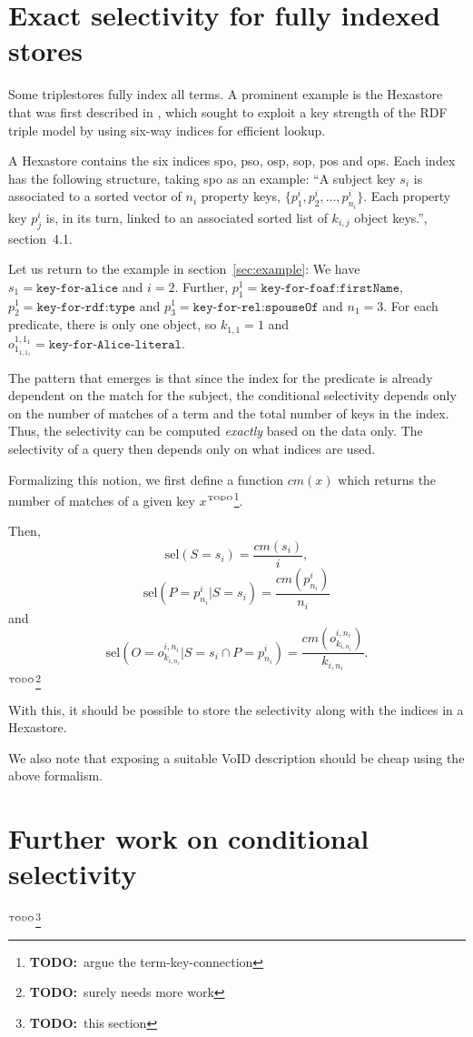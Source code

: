 \documentclass[12pt, draft]{article}
\newcommand{\todo}[1]{\ensuremath{^{\textrm{\tiny{TODO}\normalsize}}}\footnote{\textbf{TODO:}~#1}}
\newcommand{\sel}[1]{\ensuremath{\mathrm{sel}\left(#1\right)}}
\begin{document}
\section{Exact selectivity for fully indexed stores}

Some triplestores fully index all terms. A prominent example is the
Hexastore that was first described in
\cite{Weiss:2008:HSI:1453856.1453965}, which sought to exploit a key
strength of the RDF triple model by using six-way indices for
efficient lookup.

A Hexastore contains the six indices \textsf{spo}, \textsf{pso},
\textsf{osp}, \textsf{sop}, \textsf{pos} and \textsf{ops}. Each index
has the following structure, taking \textsf{spo} as an example: ``A
subject key $s_i$ is associated to a sorted vector of $n_i$ property
keys, $\{p_1^i , p_2^i , \ldots , p^i_{n_i} \}$. Each property key $p_j^i$
is, in its turn, linked to an associated sorted list of $k_{i,j}$
object keys.''\cite{Weiss:2008:HSI:1453856.1453965}, section~4.1.

Let us return to the example in section~\ref{sec:example}: We have
$s_1 = \texttt{key-for-alice}$ and $i=2$. Further, $p_1^1 =
\texttt{key-for-foaf:firstName}$, $p_2^1 = \texttt{key-for-rdf:type}$ and $p_3^1 =
\texttt{key-for-rel:spouseOf}$ and $n_1 = 3$. For each predicate, there is only
one object, so $k_{1,1} = 1$ and $o_{1_{1,1_1}}^{1,1_1} = \texttt{key-for-Alice-literal}$.

The pattern that emerges is that since the index for the predicate is
already dependent on the match for the subject, the conditional
selectivity depends only on the number of matches of a term and the
total number of keys in the index. Thus, the selectivity can be
computed \emph{exactly} based on the data only. The selectivity of a
query then depends only on what indices are used. 

Formalizing this notion, we first define a function $cm(x)$ which
returns the number of matches of a given key $x$\todo{argue the
  term-key-connection}. 

Then, 
\begin{equation}
\sel{S = s_i} = \frac{cm(s_i)}{i} ,
\end{equation}
\begin{equation}
\sel{P = p_{n_i}^i|S = s_i} = \frac{cm(p_{n_i}^i)}{n_i}
\end{equation}
and
\begin{equation}
\sel{O = o_{k_{i,n_i}}^{i,n_i} |S = s_i \cap P = p_{n_i}^i} =
\frac{cm(o_{k_{i,n_i}}^{i,n_i})}{k_{i,n_i}} .
\end{equation}
\todo{surely needs more work}

With this, it should be possible to store the selectivity along with
the indices in a Hexastore.

We also note that exposing a suitable VoID description should be cheap
using the above formalism.

\section{Further work on conditional selectivity}

\todo{this section}



\end{document}
